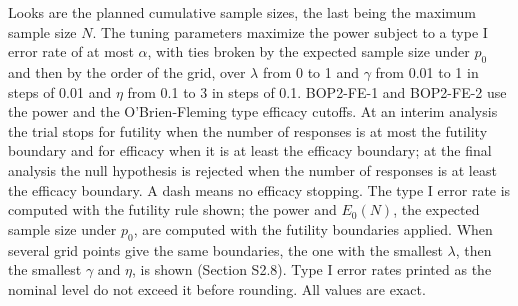 \begin{table}
\begin{minipage}{0.95\textwidth}
Looks are the planned cumulative sample sizes, the last being the maximum sample size $N$. The tuning parameters maximize the power subject to a type I error rate of at most $\alpha$, with ties broken by the expected sample size under $p_0$ and then by the order of the grid, over $\lambda$ from 0 to 1 and $\gamma$ from 0.01 to 1 in steps of 0.01 and $\eta$ from 0.1 to 3 in steps of 0.1. BOP2-FE-1 and BOP2-FE-2 use the power and the O'Brien-Fleming type efficacy cutoffs. At an interim analysis the trial stops for futility when the number of responses is at most the futility boundary and for efficacy when it is at least the efficacy boundary; at the final analysis the null hypothesis is rejected when the number of responses is at least the efficacy boundary. A dash means no efficacy stopping. The type I error rate is computed with the futility rule shown; the power and $E_0(N)$, the expected sample size under $p_0$, are computed with the futility boundaries applied. When several grid points give the same boundaries, the one with the smallest $\lambda$, then the smallest $\gamma$ and $\eta$, is shown (Section S2.8). Type I error rates printed as the nominal level do not exceed it before rounding. All values are exact.
\end{minipage}
\end{table}
